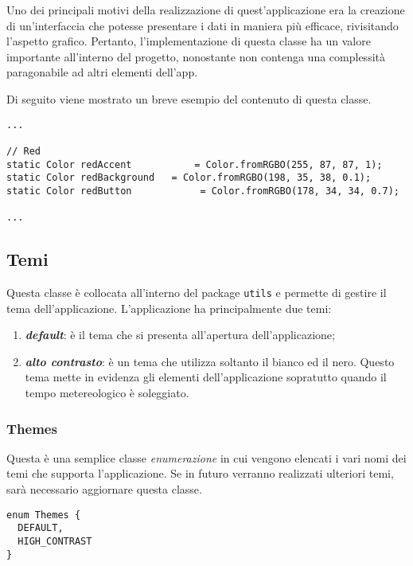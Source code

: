 Uno dei principali motivi della realizzazione di quest'applicazione era la creazione di un'interfaccia che potesse presentare i dati in maniera più efficace, rivisitando l'aspetto grafico. Pertanto, l'implementazione di questa classe ha un valore importante all'interno del progetto, nonostante non contenga una complessità paragonabile ad altri elementi dell'app.

Di seguito viene mostrato un breve esempio del contenuto di questa classe.

\begin{lstlisting}
...

// Red
static Color redAccent           = Color.fromRGBO(255, 87, 87, 1);
static Color redBackground   = Color.fromRGBO(198, 35, 38, 0.1);
static Color redButton            = Color.fromRGBO(178, 34, 34, 0.7);

...
\end{lstlisting}

\subsection{Temi}
Questa classe è collocata all'interno del package \verb|utils| e permette di gestire il tema dell'applicazione. L'applicazione ha principalmente due temi: 
\begin{enumerate}
	\item \textbf{\textit{default}}: è il tema che si presenta all'apertura dell'applicazione;
	\item \textbf{\textit{alto contrasto}}: è un tema che utilizza soltanto il bianco ed il nero. Questo tema mette in evidenza gli elementi dell'applicazione sopratutto quando il tempo metereologico è soleggiato.
\end{enumerate}

\subsubsection{Themes}
Questa è una semplice classe \textit{enumerazione} in cui vengono elencati i vari nomi dei temi che supporta l'applicazione. Se in futuro verranno realizzati ulteriori temi, sarà necessario aggiornare questa classe.

\begin{lstlisting}
enum Themes {
  DEFAULT,
  HIGH_CONTRAST
}
\end{lstlisting}

